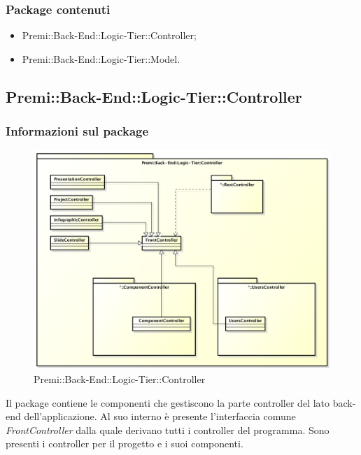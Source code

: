 	\subsubsection*{Package contenuti}
	\begin{itemize}
		\item Premi::Back-End::Logic-Tier::Controller;
		\item Premi::Back-End::Logic-Tier::Model.
	\end{itemize}


\subsection{Premi::Back-End::Logic-Tier::Controller}
	\subsubsection*{Informazioni sul package}
	\begin{figure}[h]
		\centering
		\includegraphics[width=0.9\linewidth]{img/back-end_logic-tier_controller}
		\caption[Premi::Back-End::Logic-Tier::Controller]{Premi::Back-End::Logic-Tier::Controller}
	\end{figure}
	Il package contiene le componenti che gestiscono la parte controller del lato back-end dell'applicazione. Al suo interno è presente l'interfaccia comune \textit{FrontController} dalla quale derivano tutti i controller del programma.
	Sono presenti i controller per il progetto e i suoi componenti.

